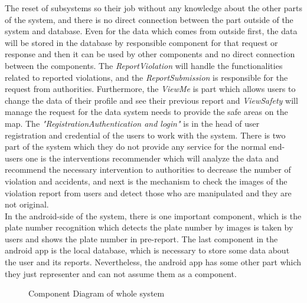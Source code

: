   The reset of subsystems so their job without any knowledge about the other parts of the system, and there is no direct connection between the part outside of the system and database. Even for the data which comes from outside first, the data will be stored in the database by responsible component for that request or response and then it can be used by other components and no direct connection between the components. The  \emph{ReportViolation} will handle the functionalities related to reported violations, and the  \emph{ReportSubmission} is responsible for the request from authorities. Furthermore, the  \emph{ViewMe} is part which allows users to change the data of their profile and see their previous report and  \emph{ViewSafety} will manage the request for the data system needs to provide the safe areas on the map. The  \emph{"Registration\/Authentication and login"} is in the head of user registration and credential of the users to work with the system. There is two part of the system which they do not provide any service for the normal end-users one is the interventions recommender which will analyze the data and recommend the necessary intervention to authorities to decrease the number of violation and accidents, and next is the mechanism to check the images of the violation report from users and detect those who are manipulated and they are not original.\\
  In the android-side of the system, there is one important component, which is the plate number recognition which detects the plate number by images is taken by users and shows the plate number in pre-report. The last component in the android app is the local database, which is necessary to store some data about the user and its reports. Nevertheless, the android app has some other part which they just representer and can not assume them as a component.


\begin{sidewaysfigure}
\begin{figure}[H]
\caption{Component Diagram of whole system}
\label{fig:Class}
\centering

\end{figure}
\end{sidewaysfigure}

